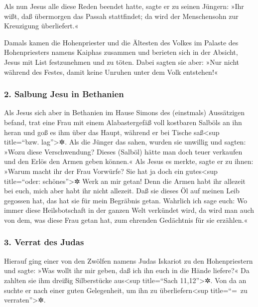  Als nun Jesus alle diese Reden beendet hatte, sagte er zu
seinen Jüngern:  »Ihr wißt, daß übermorgen das Passah
stattfindet; da wird der Menschensohn zur Kreuzigung überliefert.«

 Damals kamen die Hohenpriester und die Ältesten des
Volkes im Palaste des Hohenpriesters namens Kaiphas zusammen
 und berieten sich in der Absicht, Jesus mit List
festzunehmen und zu töten.  Dabei sagten sie aber: »Nur
nicht während des Festes, damit keine Unruhen unter dem Volk entstehen!«

\hypertarget{salbung-jesu-in-bethanien}{%
\subsubsection{2. Salbung Jesu in
Bethanien}\label{salbung-jesu-in-bethanien}}

 Als Jesus sich aber in Bethanien im Hause Simons des
(einstmals) Aussätzigen befand,  trat eine Frau mit einem
Alabastergefäß voll kostbaren Salböls an ihn heran und goß es ihm über
das Haupt, während er bei Tische saß\textless sup title=``bzw.
lag''\textgreater✲.  Als die Jünger das sahen, wurden sie
unwillig und sagten: »Wozu diese Verschwendung?  Dieses
(Salböl) hätte man doch teuer verkaufen und den Erlös den Armen geben
können.«  Als Jesus es merkte, sagte er zu ihnen: »Warum
macht ihr der Frau Vorwürfe? Sie hat ja doch ein gutes\textless sup
title=``oder: schönes''\textgreater✲ Werk an mir getan! 
Denn die Armen habt ihr allezeit bei euch, mich aber habt ihr nicht
allezeit.  Daß sie dieses Öl auf meinen Leib gegossen
hat, das hat sie für mein Begräbnis getan.  Wahrlich ich
sage euch: Wo immer diese Heilsbotschaft in der ganzen Welt verkündet
wird, da wird man auch von dem, was diese Frau getan hat, zum ehrenden
Gedächtnis für sie erzählen.«

\hypertarget{verrat-des-judas}{%
\subsubsection{3. Verrat des Judas}\label{verrat-des-judas}}

 Hierauf ging einer von den Zwölfen namens Judas Iskariot
zu den Hohenpriestern  und sagte: »Was wollt ihr mir
geben, daß ich ihn euch in die Hände liefere?« Da zahlten sie ihm
dreißig Silberstücke aus\textless sup title=``Sach 11,12''\textgreater✲.
 Von da an suchte er nach einer guten Gelegenheit, um ihn
zu überliefern\textless sup title=``=~zu verraten''\textgreater✲.

